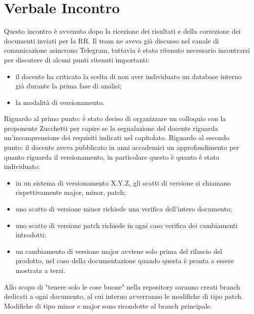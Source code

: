 \section{Verbale Incontro}
    Questo incontro è avvenuto dopo la ricezione dei risultati e della correzione dei documenti inviati per la RR. Il team ne aveva già discusso nel canale di comunicazione asincrono Telegram, tuttavia è stato ritenuto necessario incontrarsi per discutere di alcuni punti ritenuti importanti:
    \begin{itemize}
        \item il docente ha criticato la scelta di non aver individuato un database interno già durante la prima fase di analisi;
        \item la modalità di versionamento.
    \end{itemize}
    Riguardo al primo punto: è stato deciso di organizzare un colloquio con la proponente Zucchetti per capire se la segnalazione del docente riguarda un'incomprensione dei requisiti indicati nel capitolato.
    \noindent Riguardo al secondo punto: il docente aveva pubblicato in anni accademici un approfondimento per quanto riguarda il versionamento, in particolare questo è quanto è stato individuato:
    \begin{itemize}
        \item in un sistema di versionamento X.Y.Z, gli scatti di versione si chiamano rispettivamente major, minor, patch;
        \item uno scatto di versione minor richiede una verifica dell'intero documento;
        \item uno scatto di versione patch richiede in ogni caso verifica dei cambiamenti introdotti;
        \item un cambiamento di versione major avviene solo prima del rilascio del prodotto, nel caso della documentazione quando questa è pronta a essere mostrata a terzi.
    \end{itemize}
    Allo scopo di "tenere solo le cose buone" nella repository saranno creati branch dedicati a ogni documento, al cui interno avverranno le modifiche di tipo patch. Modifiche di tipo minor e major sono ricondotte al branch principale.
